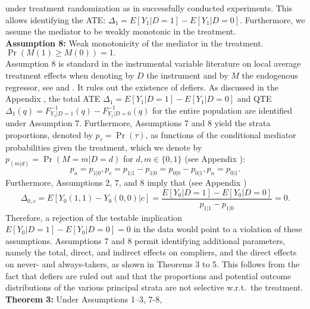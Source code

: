 \documentclass[a4paper,12pt]{article}
\begin{document}
 \doublespacing \pagestyle{plain}
under treatment randomization as in successfully conducted experiments. This allows identifying the ATE: $\Delta_1 = E[Y_1|D=1] -E[Y_1|D=0]$.
Furthermore, we assume the mediator to be weakly monotonic in the treatment.\vspace{5 pt}\\
\textbf{Assumption 8:} Weak monotonicity of the mediator in the treatment.\\
$\Pr(M(1) \geq M(0)) =1.$\vspace{5 pt}\\
Assumption 8 is standard in the instrumental variable literature on local average treatment effects when denoting by $D$ the instrument and by $M$ the endogenous regressor, see  and . It rules out the existence of defiers.
As discussed in the Appendix , the total ATE $\Delta_1= E[Y_1 |D=1]- E[Y_1 |D=0]$ and QTE $\Delta_1(q) = F_{Y_{1} |D=1}^{-1}(q)- F_{Y_{1} |D=0}^{-1}(q)$ for the entire population are identified under Assumption 7. Furthermore, Assumptions 7 and 8 yield the strata proportions, denoted by $p_{\tau}= \Pr(\tau)$, as functions of the conditional mediator probabilities given the treatment, which we denote by $p_{(m|d)}=\Pr(M=m|D=d)$ for $d, m \in \{0,1\}$ (see Appendix ):
\begin{equation} 
p_a =p_{1|0}, p_c = p_{1|1}-p_{1|0} = p_{0|0}-p_{0|1}, p_n = p_{0|1}.
\end{equation}
Furthermore, Assumptions 2, 7, and 8 imply that (see Appendix )
\begin{equation} 
\Delta_{0,c} =E[Y_0(1,1) - Y_0(0,0)|c] = \frac{E[Y_0|D=1] -E[Y_0|D=0] }{p_{1|1} - p_{1|0}} =  0.
\end{equation}
Therefore, a rejection of the testable implication $E[Y_0|D=1] -E[Y_0|D=0]=0$ in the data would point to a violation of these assumptions.
Assumptions 7 and 8 permit identifying additional parameters, namely the total, direct, and indirect effects on compliers, and the direct effects on never- and always-takers, as shown in Theorems 3 to 5. This follows from the fact that defiers are ruled out and that the proportions and potential outcome distributions of the various principal strata are not selective w.r.t.\ the treatment.\\
\noindent \textbf{Theorem 3:} Under Assumptions 1–3, 7-8,
\end{document}
